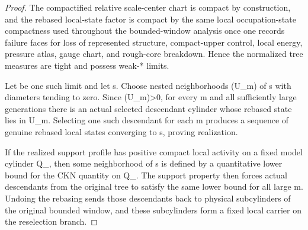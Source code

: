 \documentclass[11pt]{amsart}
\def\({}%
\def\){}%
\def\mathfrak#1{#1}%
\theoremstyle{plain}
\theoremstyle{definition}
\theoremstyle{remark}
\begin{document}
\begin{proof}
The compactified relative scale-center chart is compact by construction, and the
rebased local-state factor is compact by the same local occupation-state
compactness used throughout the bounded-window analysis once one records
failure faces for loss of represented structure, compact-upper control, local
energy, pressure atlas, gauge chart, and rough-core breakdown.  Hence the
normalized tree measures are tight and possess weak-* limits.

Let \(\Theta\) be one such limit and let
\(\mathfrak s\in{}\Theta\).  Choose nested neighborhoods
\((U_m)\) of \(\mathfrak s\) with diameters tending to zero.  Since
\(\Theta(U_m)>0\), for every \(m\) and all sufficiently large generations there
is an actual selected descendant cylinder whose rebased state lies in \(U_m\).
Selecting one such descendant for each \(m\) produces a sequence of genuine
rebased local states converging to \(\mathfrak s\), proving realization.

If the realized support profile has positive compact local activity on a fixed
model cylinder \(Q_\rho\), then some neighborhood of \(\mathfrak s\) is defined
by a quantitative lower bound for the CKN quantity on \(Q_\rho\).  The support
property then forces actual descendants from the original tree to satisfy the
same lower bound for all large \(m\).  Undoing the rebasing sends those
descendants back to physical subcylinders of the original bounded window, and
these subcylinders form a fixed local carrier on the reselection branch.
\end{proof}
\end{document}
